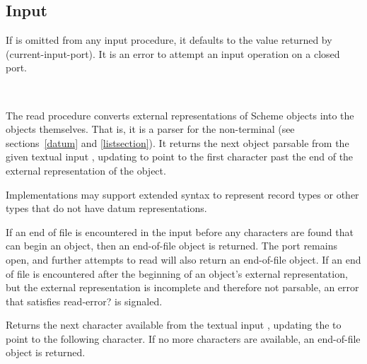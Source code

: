 \subsection{Input}
\label{inputsection}

If  is omitted from any input procedure, it defaults to the
value returned by {\cf (current-input-port)}.
It is an error to attempt an input operation on a closed port.

\noindent \hbox{ }  %
\vspace{-5ex}


\begin{entry}{%
}

The {\cf read} procedure converts external representations of Scheme objects into the
objects themselves.  That is, it is a parser for the non-terminal
 (see sections~\ref{datum} and
\ref{listsection}).  It returns the next
object parsable from the given textual input , updating
 to point to
the first character past the end of the external representation of the object.

Implementations may support extended syntax to represent record types or
other types that do not have datum representations.

\vest If an end of file is encountered in the input before any
characters are found that can begin an object, then an end-of-file
object is returned.  The port remains open, and further attempts
to read will also return an end-of-file object.  If an end of file is
encountered after the beginning of an object's external representation,
but the external representation is incomplete and therefore not parsable,
an error that satisfies {\cf read-error?} is signaled.

\end{entry}

\begin{entry}{%
}

Returns the next character available from the textual input ,
updating
the  to point to the following character.  If no more characters
are available, an end-of-file object is returned.  

\end{entry}


